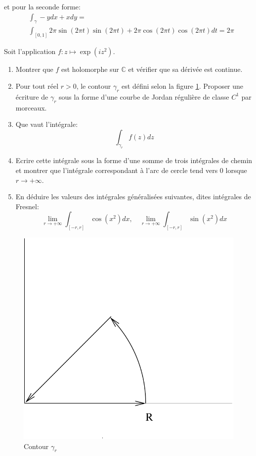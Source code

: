 \documentclass[a4paper, 12pt]{amsart}
\begin{document}
et pour la seconde forme:
\begin{align*}
&\int_{\gamma} -y dx + x dy = \\ 
& \int_{[0,1]}  2 \pi \sin\left( 2 \pi t \right) \sin\left( 2 \pi t \right) + 2 \pi \cos\left( 2 \pi t \right) \cos\left( 2 \pi t \right) dt = 2 \pi 
\end{align*}
\begin{fex}
 Soit l'application $f \colon z \mapsto \exp\left(i z^2\right)$. 
\begin{enumerate}
  \item Montrer que $f$ est holomorphe sur $\mathbb{C}$ et vérifier que sa
  dérivée est continue.
  \item Pour tout réel $r > 0$, le contour $\gamma_r$ est défini selon la figure
  \ref{fig:contour2}. Proposer une écriture de $\gamma_r$ sous la forme d'une
  courbe de Jordan régulière de classe $C^1$ par morceaux.
  \item Que vaut l'intégrale:
  \[
  \int_{\gamma_r} f(z) dz
  \]
  \item Ecrire cette intégrale sous la forme d'une somme de trois
  intégrales de chemin et montrer que l'intégrale correspondant à l'arc de
  cercle tend vers 0 lorsque $r \to +\infty$.
  \item En déduire les valeurs des intégrales généralisées suivantes, dites
  intégrales de Fresnel:
  \[
  \lim_{r \to +\infty} \int_{[-r,r]} \cos(x^2) dx, \quad  \lim_{r \to +\infty}
  \int_{[-r,r]} \sin(x^2) dx
  \]
\end{enumerate}
\end{fex}
 \begin{figure}[ht]
\includegraphics[scale=0.3]{contour_fresnel.pdf}
\caption{Contour $\gamma_r$}\label{fig:contour2}
\end{figure}
\end{document}
